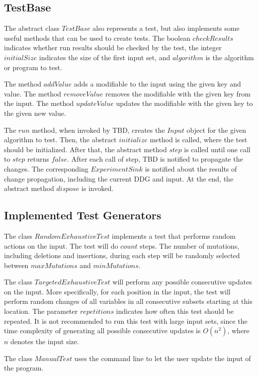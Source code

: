 \subsection{TestBase}

The abstract class $TestBase$ also represents a test, but also implements some useful methods that can be used to create tests. The boolean $checkResults$ indicates whether run results should be checked by the test, the integer $initialSize$ indicates the size of the first input set, and $algorithm$ is the algorithm or program to test. 

The method $addValue$ adds a modifiable to the input using the given key and value. The method $removeValue$ removes the modifiable with the given key from the input. 
The method $updateValue$ updates the modifiable with the given key to the given new value. 

The $run$ method, when invoked by TBD, creates the $Input$ object for the given algorithm to test. Then, the abstract $initialize$ method is called, where the test should be initialized. After that, the abstract method $step$ is called until one call to $step$ returns $false$. After each call of step, TBD is notified to propagate the changes. The corresponding $ExperimentSink$ is notified about the results of change propagation, including the current DDG and input. At the end, the abstract method $dispose$ is invoked.

\subsection{Implemented Test Generators}

The class $RandomExhaustiveTest$ implements a test that performs random actions on the input. The test will do $count$ steps. The number of mutations, including deletions and insertions, during each step will be randomly selected between $maxMutations$ and $minMutations$. 

The class $TargetedExhaustiveTest$ will perform any possible consecutive updates on the input. More specifically, for each position in the input, the test will perform random changes of all variables in all consecutive subsets starting at this location. The parameter $repetitions$ indicates how often this test should be repeated. It is not recommended to run this test with large input sets, since the time complexity of generating all possible consecutive updates is $O(n^2)$, where $n$ denotes the input size.

The class $ManualTest$ uses the command line to let the user update the input of the program. 

